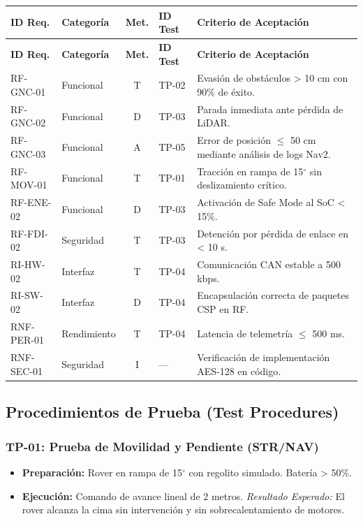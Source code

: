 \begin{longtable}{|l|p{3cm}|c|l|p{5cm}|}
    \hline
    \rowcolor{AgencyBlue!20} \textbf{ID Req.} & \textbf{Categoría} & \textbf{Met.} & \textbf{ID Test} & \textbf{Criterio de Aceptación} \\ \hline
    \endfirsthead
    \hline
    \rowcolor{AgencyBlue!20} \textbf{ID Req.} & \textbf{Categoría} & \textbf{Met.} & \textbf{ID Test} & \textbf{Criterio de Aceptación} \\ \hline
    \endhead
    RF-GNC-01 & Funcional & T & TP-02 & Evasión de obstáculos > 10 cm con 90\% de éxito. \\ \hline
    RF-GNC-02 & Funcional & D & TP-03 & Parada inmediata ante pérdida de LiDAR. \\ \hline
    RF-GNC-03 & Funcional & A & TP-05 & Error de posición $\le$ 50 cm mediante análisis de logs Nav2. \\ \hline
    RF-MOV-01 & Funcional & T & TP-01 & Tracción en rampa de 15$^\circ$ sin deslizamiento crítico. \\ \hline
    RF-ENE-02 & Funcional & D & TP-03 & Activación de Safe Mode al SoC < 15\%. \\ \hline
    RF-FDI-02 & Seguridad & T & TP-03 & Detención por pérdida de enlace en < 10 s. \\ \hline
    RI-HW-02 & Interfaz & T & TP-04 & Comunicación CAN estable a 500 kbps. \\ \hline
    RI-SW-02 & Interfaz & D & TP-04 & Encapsulación correcta de paquetes CSP en RF. \\ \hline
    RNF-PER-01 & Rendimiento & T & TP-04 & Latencia de telemetría $\le$ 500 ms. \\ \hline
    RNF-SEC-01 & Seguridad & I & --- & Verificación de implementación AES-128 en código. \\ \hline
\end{longtable}

\subsection{Procedimientos de Prueba (Test Procedures)}

\subsubsection{TP-01: Prueba de Movilidad y Pendiente (STR/NAV)}
\begin{itemize}
    \item \textbf{Preparación:} Rover en rampa de 15$^\circ$ con regolito simulado. Batería > 50\%.
    \item \textbf{Ejecución:} Comando de avance lineal de 2 metros.
    \textit{Resultado Esperado:} El rover alcanza la cima sin intervención y sin sobrecalentamiento de motores.
\end{itemize}

